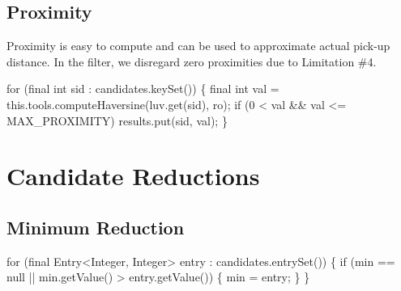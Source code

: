\section{Proximity}

Proximity is easy to compute and can be used to approximate actual pick-up
distance. In the filter, we disregard zero proximities due to Limitation \#4.

\nwenddocs{}\endmoddef\nwstartdeflinemarkup{}\nwenddeflinemarkup
for (final int sid : candidates.keySet()) \{
  final int val = this.tools.computeHaversine(luv.get(sid), ro);
  if (0 < val && val <= MAX_PROXIMITY)
    results.put(sid, val);
\}
\nwendcode{}\nwdocspar


\nwenddocs{}\chapter{Candidate Reductions}
\label{search-reductions}

\section{Minimum Reduction}

\nwenddocs{}\endmoddef\nwstartdeflinemarkup{}\nwenddeflinemarkup
for (final Entry<Integer, Integer> entry : candidates.entrySet()) \{
  if (min == null || min.getValue() > entry.getValue()) \{
    min = entry;
  \}
\}
\nwendcode{}\nwdocspar

